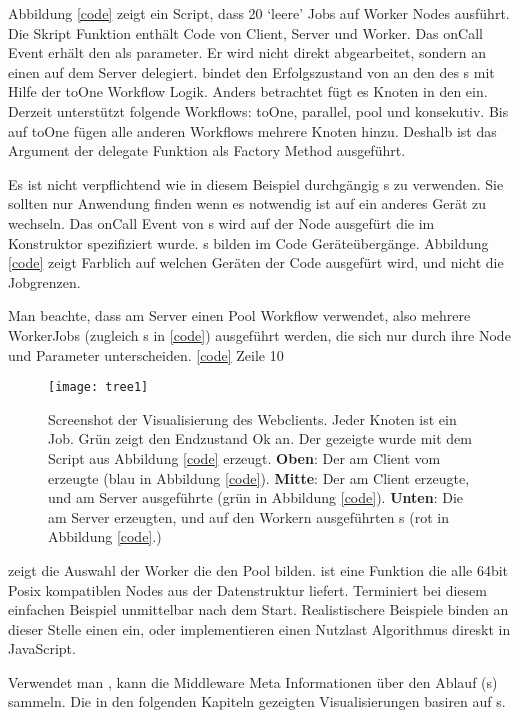 Abbildung \ref{code} zeigt ein Script, dass 20 ‘leere’ Jobs auf Worker Nodes ausführt.
Die Skript Funktion enthält Code von Client, Server und Worker.
Das onCall Event erhält den \RootJob{}  als parameter.
Er wird nicht direkt abgearbeitet, sondern an einen \remoteJob{} auf dem Server delegiert.
 bindet den Erfolgszustand von  an den des \remoteJob s  mit Hilfe der toOne Workflow Logik.
Anders betrachtet fügt es Knoten in den \JobTree{} ein.
Derzeit unterstützt  folgende Workflows:
toOne,
parallel,
pool und
konsekutiv.
Bis auf toOne fügen alle anderen Workflows mehrere Knoten hinzu.
Deshalb ist das  Argument der delegate Funktion als Factory Method \cite{Gamma05a} ausgeführt.

Es ist nicht verpflichtend wie in diesem Beispiel durchgängig \remoteJob s zu verwenden.
Sie sollten nur Anwendung finden wenn es notwendig ist auf ein anderes Gerät zu wechseln.
Das onCall Event von \remoteJob s wird auf der Node ausgefürt die im Konstruktor spezifiziert wurde.
\remoteJob s bilden im Code Geräteübergänge.
Abbildung \ref{code} zeigt Farblich auf welchen Geräten der Code ausgefürt wird, und nicht die Jobgrenzen.

Man beachte, dass  am Server einen Pool Workflow verwendet, also mehrere WorkerJobs (zugleich \remoteJob s in \ref{code}) ausgeführt werden, die sich nur durch ihre Node und Parameter unterscheiden.
\ref{code} Zeile 10

\begin{wrapfigure}{L}{0.6\textwidth}
  \begin{center}
    \texttt{[image: tree1]}
  \end{center}
  \caption{Screenshot der \JobTree{} Visualisierung des Webclients.
    Jeder Knoten ist ein Job. Grün zeigt den Endzustand Ok an.
    Der gezeigte \JobTree{} wurde mit dem Script aus Abbildung \ref{code} erzeugt.
    \textbf{Oben}: Der am Client vom \UI{} erzeugte \RootJob{} (blau in Abbildung \ref{code}).
    \textbf{Mitte}: Der am Client erzeugte, und am Server ausgeführte \remoteJob{} (grün in Abbildung \ref{code}).
    \textbf{Unten}: Die am Server erzeugten, und auf den Workern ausgeführten \remoteJob s (rot in Abbildung \ref{code}.)}
  \label{fsm0}
  \vspace{22pt}
\end{wrapfigure}

\noindent  zeigt die Auswahl der Worker die den Pool bilden.
 ist eine Funktion die alle 64bit Posix kompatiblen Nodes aus der \netInfo{} Datenstruktur liefert.
 Terminiert bei diesem einfachen Beispiel unmittelbar nach dem Start.
Realistischere Beispiele binden an dieser Stelle einen \OsProcessJob{} ein, oder implementieren einen Nutzlast Algorithmus direskt in JavaScript.

Verwendet man , kann die Middleware Meta Informationen über den Ablauf (\JobTree s) sammeln.
Die in den folgenden Kapiteln gezeigten Visualisierungen basiren auf \JobTree s.

